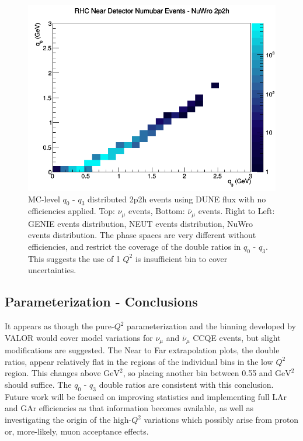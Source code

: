 \documentclass[12pt]{article}
\newcommand{\textapprox}{\raisebox{0.5ex}{\texttildelow}}
\begin{document}
\begin{figure}[h]
\endminipage
{}
\includegraphics[width=\linewidth]{q0_q3/nominal/2p2h_RHC_ND_numubar_q3_q0_NuWro.png}
\endminipage
\caption{MC-level $q_0 \textrm{ - } q_3$ distributed 2p2h events using DUNE flux with no efficiencies applied. Top: $\nu_{\mu}$ events, Bottom: $\overline{\nu}_{\mu}$ events. Right to Left: GENIE events distribution, NEUT events distribution, NuWro events distribution. The phase spaces are very different without efficiencies, and restrict the coverage of the double ratios in $q_0 \textrm{ - } q_3$. This suggests the use of 1 $Q^2$ is insufficient bin to cover uncertainties.}
\label{fig:q0q3_2p2h_events}
\end{figure}
\FloatBarrier

\subsection{Parameterization - Conclusions}
It appears as though the pure-$Q^2$ parameterization and the binning developed by VALOR would cover model variations for $\nu_{\mu}$ and $\overline{\nu}_{\mu}$ CCQE events, but slight modifications are suggested. The Near to Far extrapolation plots, the double ratios, appear relatively flat in the regions of the individual bins in the low $Q^2$ region. This changes above \textapprox{1.25} $\textrm{GeV}^2$, so placing another bin between 0.55 and \textapprox{1.25} $\textrm{GeV}^2$ should suffice. The $q_0 \textrm{ - } q_3$ double ratios are consistent with this conclusion. Future work will be focused on improving statistics and implementing full LAr and GAr efficiencies as that information becomes available, as well as investigating the origin of the high-$Q^2$ variations which possibly arise from proton or, more-likely, muon acceptance effects. 
\end{document}
